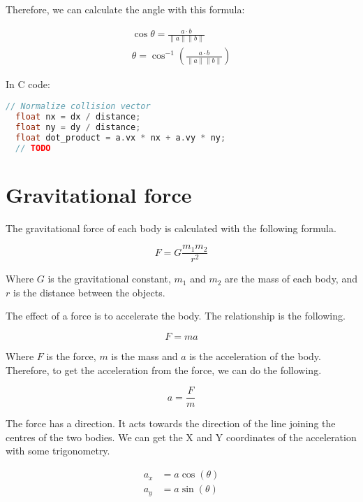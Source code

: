 \documentclass{amsart}
\begin{document}
Therefore, we can calculate the angle with this formula:

\begin{align*}
  \cos \theta = \frac{a \cdot b}{\|a\| \|b\|} \\
  \theta = \cos^{-1}(\frac{a \cdot b}{\|a\| \|b\|})
\end{align*}

In C code:

\begin{lstlisting}[language=C]
  // Normalize collision vector
  float nx = dx / distance;
  float ny = dy / distance;
  float dot_product = a.vx * nx + a.vy * ny;
  // TODO
\end{lstlisting}

\newpage

\section{Gravitational force}

The gravitational force of each body is calculated with the following formula.

\begin{displaymath}
  F = G \frac{m_1m_2}{r^2}
\end{displaymath}

Where \(G\) is the gravitational constant, \(m_1\) and \(m_2\) are the mass of
each body, and \(r\) is the distance between the objects.

The effect of a force is to accelerate the body. The relationship is the
following.

\begin{displaymath}
  F = m a
\end{displaymath}

Where \(F\) is the force, \(m\) is the mass and \(a\) is the acceleration of
the body. Therefore, to get the acceleration from the force, we can do the
following.

\begin{displaymath}
  a = \frac{F}{m}
\end{displaymath}

The force has a direction. It acts towards the direction of the line joining
the centres of the two bodies. We can get the X and Y coordinates of the
acceleration with some trigonometry.

\begin{align*}
  a_x &= a \cos(\theta) \\
  a_y &= a \sin(\theta) \\
\end{align*}
\end{document}

